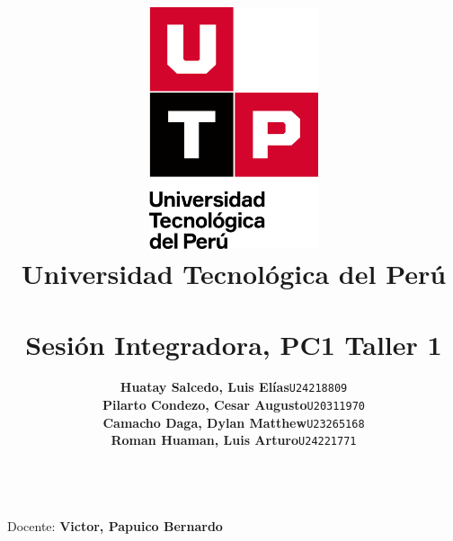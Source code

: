 \documentclass{article}
\title{
  \pagenumbering{gobble}
  \vspace{1cm}
  \includegraphics[width=5cm,clip,trim=0cm 2.9cm 0cm 0cm]{./assets/isotipo-utp.png} \\
  \vspace{0.5cm}
  \textbf{Universidad Tecnológica del Perú} \\
  \vspace{0.5cm}
  \text{Cálculo II} \\
  \vspace{1cm}
    {\huge \textbf{Sesión Integradora, PC1 Taller 1}} \\
  \vspace{1cm}
}
\author{
  \begin{tabular}{ll}
    \textbf{Huatay Salcedo, Luis Elías} & \hfill\texttt{U24218809} \\
    \textbf{Pilarto Condezo, Cesar Augusto} & \hfill\texttt{U20311970} \\
    \textbf{Camacho Daga, Dylan Matthew} & \hfill\texttt{U23265168} \\
    \textbf{Roman Huaman, Luis Arturo} & \hfill\texttt{U24221771} \\
  \end{tabular} \\
}
\begin{document}
\maketitle
\begin{center}
  Docente: \textbf{Victor, Papuico Bernardo}
\end{center}

%
%




\newpage
\setcounter{page}{1}  

\end{document}
